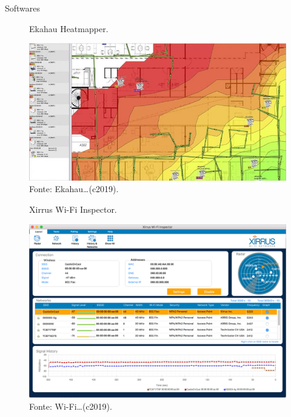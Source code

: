 \documentclass[aspectratio=169,12pt]{beamer}
\begin{document}
\begin{frame}{Softwares}
	\noindent
	\begin{minipage}[c]{0.48\linewidth}
		\begin{figure}[H]
			\caption*{{\fontsize{9pt}{11}\selectfont Ekahau Heatmapper.}}
			\centering
			\includegraphics[scale=.29]{fig_tcc/heatmapper.jpg}
			\caption*{{\fontsize{9pt}{11}\selectfont Fonte: Ekahau\ldots (c2019).}}
		\end{figure}
	\end{minipage}
	\hfill%
	\begin{minipage}[c]{.48\linewidth}
		\begin{figure}[H]
			\centering
			\caption*{{\fontsize{9pt}{11}\selectfont Xirrus Wi-Fi Inspector.}}
			\includegraphics[scale=0.133]{fig_tcc/xirrus.png}
			\caption*{{\fontsize{9pt}{11}\selectfont Fonte: Wi-Fi\ldots (c2019).}}
		\end{figure}
	\end{minipage}
\end{frame}
\end{document}
